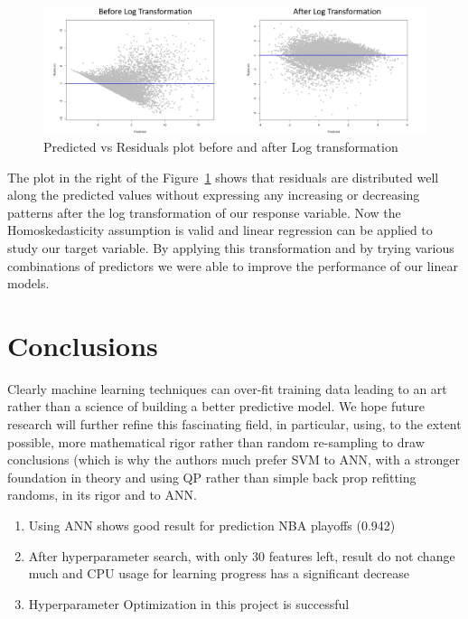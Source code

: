 \documentclass{article}
\begin{document}
\begin{figure}[H]
	\centering
        \includegraphics[width=\textwidth] {reg_fig2_fit_res.PNG}
	\caption{Predicted vs Residuals plot before and after Log transformation}
	\label{fig:reg_plot}
\end{figure}

The plot in the right of the Figure~\ref{fig:reg_plot} shows that residuals are distributed well along the predicted values without expressing any increasing or decreasing patterns after the 
log transformation of our response variable. Now the Homoskedasticity assumption is valid and linear regression can be applied to study our target variable.
By applying this transformation and by trying various combinations of predictors we were able to improve the performance of our linear models.

\section{Conclusions}

Clearly machine learning techniques can over-fit training data leading to an art rather than a science of building 
a better predictive model. We hope future research will further refine this fascinating field, in particular, 
using, to the extent possible, more mathematical rigor rather than random re-sampling to draw conclusions (which is why the authors much prefer SVM to ANN, with a stronger foundation in theory and using QP rather than simple back prop refitting randoms, in its rigor and  to ANN.

\begin{enumerate}
	\item Using ANN shows good result for prediction NBA playoffs (0.942)
	\item After hyperparameter search, with only 30 features left, result do not change much and CPU usage for learning progress has a significant decrease
	\item Hyperparameter Optimization in this project is successful 
\end{enumerate}



\nocite{Povich}
\nocite{Vanhoucke}





\end{document}
